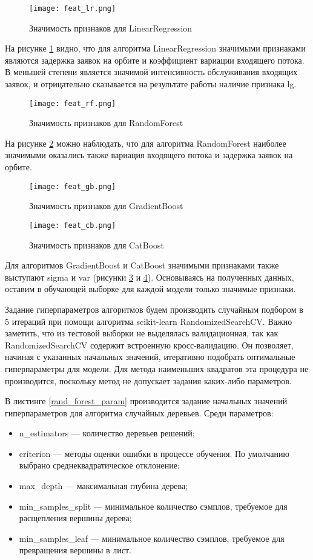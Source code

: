 \begin{figure}[H]
	\centering
	\texttt{[image: feat\_lr.png]}
	\caption{Значимость признаков для LinearRegression}
	\label{feat_lr}
\end{figure}
На рисунке \ref{feat_lr} видно, что для алгоритма LinearRegression значимыми признаками являются задержка заявок на орбите и коэффициент вариации входящего потока. В меньшей степени является значимой интенсивность обслуживания входящих заявок, и отрицательно сказывается на результате работы наличие признака lg.
\begin{figure}[H]
	\centering
	\texttt{[image: feat\_rf.png]}
	\caption{Значимость признаков для RandomForest}
	\label{feat_rf}
\end{figure}
На рисунке \ref{feat_rf} можно наблюдать, что для алгоритма RandomForest наиболее значимыми оказались также вариация входящего потока и задержка заявок на орбите.
\begin{figure}[H]
	\centering
	\texttt{[image: feat\_gb.png]}
	\caption{Значимость признаков для GradientBoost}
	\label{feat_gb}
\end{figure}
\begin{figure}[H]
	\centering
	\texttt{[image: feat\_cb.png]}
	\caption{Значимость признаков для CatBoost}
	\label{feat_cb}
\end{figure}
Для алгоритмов GradientBoost и CatBoost значимыми признаками также выступают sigma и var (рисунки \ref{feat_gb} и \ref{feat_cb}). Основываясь на полученных данных, оставим в обучающей выборке для каждой модели только значимые признаки.

Задание гиперпараметров алгоритмов \cite{feurer2019hyperparameter} будем производить случайным подбором в 5 итераций при помощи алгоритма scikit-learn RandomizedSearchCV. Важно заметить, что из тестовой выборки не выделялась валидационная, так как RandomizedSearchCV содержит встроенную кросс-валидацию. Он позволяет, начиная с указанных начальных значений, итеративно подобрать оптимальные гиперпараметры для модели. Для метода наименьших квадратов эта процедура не производится, поскольку метод не допускает задания каких-либо параметров.

В листинге \ref{rand_forest_param} производится задание начальных значений гиперпараметров для алгоритма случайных деревьев. Среди параметров:
\begin{itemize}
	\item n\_estimators --- количество деревьев решений;
	\item criterion --- методы оценки ошибки в процессе обучения. По умолчанию выбрано среднеквадратическое отклонение;
	\item max\_depth --- максимальная глубина дерева;
	\item min\_samples\_split --- минимальное количество сэмплов, требуемое для расщепления вершины дерева;
	\item min\_samples\_leaf --- минимальное количество сэмплов, требуемое для превращения вершины в лист.
\end{itemize}


